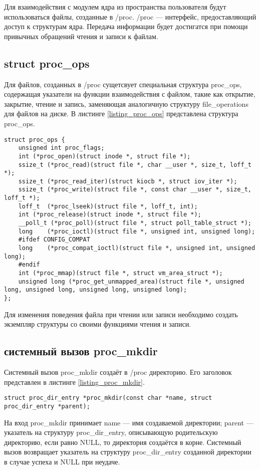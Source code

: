 Для взаимодействия с модулем ядра из пространства пользователя будут использоваться файлы, созданные в /proc.
/proc --- интерфейс, предоставляющий доступ к структурам ядра. Передача информации будет достигатся при помощи привычных обращений чтения и записи к файлам.

\subsection{struct proc\_ops}

Для файлов, созданных в /proc сущетсвует специальная структура proc\_ops, содержащая указатели на функции взаимодействия с файлом, такие как открытие, закрытие, чтение и запись, заменяющая аналогичную структуру file\_operations для файлов на диске.
В листинге \ref{listing_proc_ops} представлена структура proc\_ops.

\begin{center}
	\begin{lstlisting}[label=listing_proc_ops,caption=Структура proc\_ops]
struct proc_ops {
	unsigned int proc_flags;
	int	(*proc_open)(struct inode *, struct file *);
	ssize_t	(*proc_read)(struct file *, char __user *, size_t, loff_t *);
	ssize_t (*proc_read_iter)(struct kiocb *, struct iov_iter *);
	ssize_t	(*proc_write)(struct file *, const char __user *, size_t, loff_t *);
	loff_t	(*proc_lseek)(struct file *, loff_t, int);
	int	(*proc_release)(struct inode *, struct file *);
	__poll_t (*proc_poll)(struct file *, struct poll_table_struct *);
	long	(*proc_ioctl)(struct file *, unsigned int, unsigned long);
	#ifdef CONFIG_COMPAT
	long	(*proc_compat_ioctl)(struct file *, unsigned int, unsigned long);
	#endif
	int	(*proc_mmap)(struct file *, struct vm_area_struct *);
	unsigned long (*proc_get_unmapped_area)(struct file *, unsigned long, unsigned long, unsigned long, unsigned long);
};
	\end{lstlisting}
\end{center}

Для изменения поведения файла при чтении или записи необходимо создать экземпляр структуры со своими функциями чтения и записи.



\subsection{системный вызов proc\_mkdir}

Системный вызов proc\_mkdir создаёт в /proc директорию.
Его заголовок представлен в листинге \ref{listing_proc_mkdir}.
\begin{center}
	\begin{lstlisting}[label=listing_proc_mkdir,caption=Заголовок системного вызова proc\_mkdir]
struct proc_dir_entry *proc_mkdir(const char *name, struct proc_dir_entry *parent);
	\end{lstlisting}
\end{center}
На вход proc\_mkdir принимает name --- имя создаваемой директории; parent --- указатель на структуру proc\_dir\_entry, описывающую родительскую директорию, если равно NULL, то директория создаётся в корне.
Системный вызов возвращает указатель на структуру proc\_dir\_entry созданной директории в случае успеха и NULL при неудаче.

